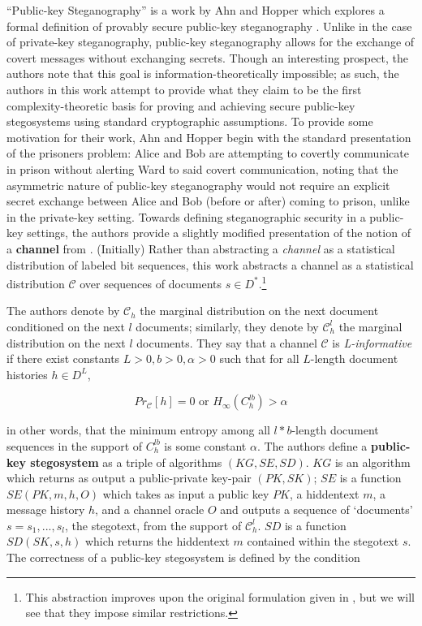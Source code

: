 \documentclass{article}
\begin{document}
``Public-key Steganography'' is a work by Ahn and Hopper which explores a formal definition 
of provably secure public-key steganography \cite{BiglouPubKey}.  Unlike in the case of 
private-key steganography, public-key steganography allows for the exchange of covert 
messages without exchanging secrets.  Though an interesting prospect, the authors note that 
this goal is information-theoretically impossible; as such, 
the authors in this work attempt to provide what they claim to be the first complexity-theoretic basis for proving and 
achieving secure public-key stegosystems using standard cryptographic assumptions.
\newline\newline
To provide some motivation for their work, Ahn and Hopper begin with the standard presentation of the 
prisoners problem: Alice and Bob are attempting to covertly communicate in prison without alerting 
Ward to said covert communication, noting that the asymmetric nature of public-key steganography would not 
require an explicit secret exchange between Alice and Bob (before or after) coming to prison, unlike in the private-key setting.
\newline\newline
Towards defining steganographic security in a public-key settings, the authors provide a slightly modified presentation 
of the notion of a \textbf{channel} from \cite{BiglouPSS}.  (Initially) Rather than abstracting a \textit{channel} 
as a statistical distribution of labeled bit sequences, this work abstracts a channel as a statistical distribution 
$\mathcal{C}$ over sequences of documents $s \in D^*$.\footnote{This abstraction improves upon the original formulation given in 
\cite{BiglouPSS}, but we will see that they impose similar restrictions.}

The authors denote by $\mathcal{C}_h$ the marginal distribution on the next document conditioned on the next 
$l$ documents; similarly, they denote by $\mathcal{C}_h^l$ the marginal distribution on the next $l$ documents.
They say that a channel $\mathcal{C}$ is \textit{L-informative} if there exist constants $L > 0, b > 0, \alpha > 0$ such that 
for all $L$-length document histories $h \in D^L$, 

\[Pr_{\mathcal{C}}[h] = 0 \text{ or } H_{\infty}(C_h^{lb}) > \alpha \]

\noindent in other words, 
that the minimum entropy among all $l*b$-length document sequences in the support of $C_h^{lb}$ is some constant $\alpha$.
\newline\newline
The authors define a \textbf{public-key stegosystem} as a triple of algorithms $(KG, SE, SD)$.  $KG$ is an algorithm which 
returns as output a public-private key-pair $(PK, SK)$; $SE$ is a function $SE(PK, m, h, O)$ which takes as input a public key $PK$,
a hiddentext $m$, a message history $h$, and a channel oracle $O$ and outputs a sequence of `documents' $s = s_1,...,s_l$, the stegotext, 
from the support of $\mathcal{C}_h^l$.  $SD$ is a function $SD(SK, s, h)$ which returns the hiddentext $m$ contained within the stegotext $s$.
The correctness of a public-key stegosystem is defined by the condition
\end{document}
